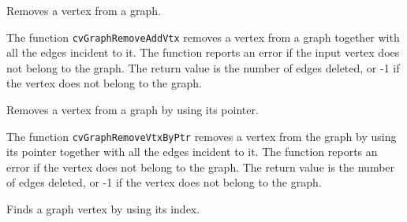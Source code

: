\label{GraphRemoveVtx}

Removes a vertex from a graph.


\begin{description}
\end{description}

The function \texttt{cvGraphRemoveAddVtx} removes a vertex from a graph
together with all the edges incident to it. The function reports an error
if the input vertex does not belong to the graph. The return value is the
number of edges deleted, or -1 if the vertex does not belong to the graph.

\label{GraphRemoveVtxByPtr}

Removes a vertex from a graph by using its pointer.


\begin{description}
\end{description}


The function \texttt{cvGraphRemoveVtxByPtr} removes a vertex from the graph by using its pointer together with all the edges incident to it. The function reports an error if the vertex does not belong to the graph. The return value is the number of edges deleted, or -1 if the vertex does not belong to the graph.

\label{GetGraphVtx}

Finds a graph vertex by using its index.


\begin{description}
\end{description}


